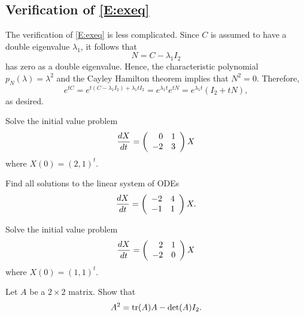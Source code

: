 \documentclass{ximera}
\begin{document}
\subsection*{Verification of \protect\eqref{E:exeq}}

The verification of \eqref{E:exeq} is less complicated.  Since $C$ is assumed
to have a double eigenvalue $\lambda_1$, it follows that
\[
N = C - \lambda_1 I_2
\]
has zero as a double eigenvalue.  Hence, the characteristic polynomial
$p_N(\lambda) = \lambda^2$ and the Cayley Hamilton theorem implies that
$N^2=0$.  Therefore,
\[
e^{tC} = e^{t(C-\lambda_1 I_2)+\lambda_1 tI_2} =
e^{\lambda_1 t}e^{tN} = e^{\lambda_1 t}(I_2+tN),
\]
as desired.




\EXER

\TEXER

\begin{exercise} \label{c6.6.2}
Solve the initial value problem
\[
\frac{dX}{dt} = \left(\begin{array}{rr} 0 & 1\\ -2 &3\end{array}\right) X
\]
where $X(0)=(2,1)^t$.
\end{exercise}

\begin{exercise} \label{c6.6.3}
Find all solutions to the linear system of ODEs
\[
\frac{dX}{dt} = \left(\begin{array}{rr} -2 & 4\\ -1 &1\end{array}\right) X.
\]
\end{exercise}

\begin{exercise} \label{c6.6.4}
Solve the initial value problem
\[
\frac{dX}{dt} =  \left(\begin{array}{rr} 2 & 1\\ -2 &0\end{array}\right)X
\]
where $X(0)=(1,1)^t$.
\end{exercise}

\begin{exercise}  \label{c6.CH}
Let $A$ be a $2\times 2$ matrix.  Show that
\[
A^2 = {\rm tr}(A)A-\det(A)I_2.
\]
\end{exercise}
\end{document}
